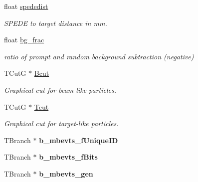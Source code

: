 \begin{DoxyCompactItemize}
\mbox{\label{classg__clx_aca4cd80422665dab4188cbf82bb569ce}} 
float \hyperlink{classg__clx_aca4cd80422665dab4188cbf82bb569ce}{spededist}
\begin{DoxyCompactList}\small\item\em S\+P\+E\+DE to target distance in mm. \end{DoxyCompactList}\item 
\mbox{\label{classg__clx_ad9d34b2f15cdb59de8b46f1f68280c5c}} 
float \hyperlink{classg__clx_ad9d34b2f15cdb59de8b46f1f68280c5c}{bg\+\_\+frac}
\begin{DoxyCompactList}\small\item\em ratio of prompt and random background subtraction (negative) \end{DoxyCompactList}\item 
\mbox{\label{classg__clx_aac4c4ec97958e7de623f4da6ce18e201}} 
T\+CutG $\ast$ \hyperlink{classg__clx_aac4c4ec97958e7de623f4da6ce18e201}{Bcut}
\begin{DoxyCompactList}\small\item\em Graphical cut for beam-\/like particles. \end{DoxyCompactList}\item 
\mbox{\label{classg__clx_adeec87c9054ed3ebe42cb6c563570e74}} 
T\+CutG $\ast$ \hyperlink{classg__clx_adeec87c9054ed3ebe42cb6c563570e74}{Tcut}
\begin{DoxyCompactList}\small\item\em Graphical cut for target-\/like particles. \end{DoxyCompactList}\item 
\mbox{\label{classg__clx_a1f538144f99e496310a1a9ae5e70105f}} 
T\+Branch $\ast$ {\bfseries b\+\_\+mbevts\+\_\+f\+Unique\+ID}
\item 
\mbox{\label{classg__clx_a139bfd9efe94ceb8342458f5bd3e030d}} 
T\+Branch $\ast$ {\bfseries b\+\_\+mbevts\+\_\+f\+Bits}
\item 
\mbox{\label{classg__clx_ab6c9d482753c7a505ae69b37b8c70a61}} 
T\+Branch $\ast$ {\bfseries b\+\_\+mbevts\+\_\+gen}
\item 
\mbox{\label{classg__clx_ad1aa921ec8371d9fd2470cc1a9166514}} 

\end{DoxyCompactItemize}

